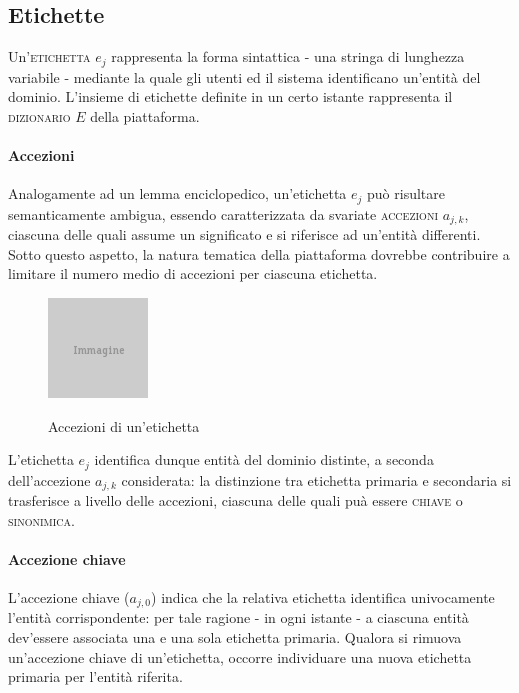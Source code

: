 \subsection{Etichette}
Un'\textsc{etichetta} $e_j$ rappresenta la forma sintattica - una stringa di lunghezza variabile - mediante la quale gli utenti ed il sistema identificano un'entità del dominio. L'insieme di etichette definite in un certo istante rappresenta il \textsc{dizionario} $E$ della piattaforma.

\paragraph{Accezioni}
Analogamente ad un lemma enciclopedico, un'etichetta $e_j$ può risultare semanticamente ambigua, essendo caratterizzata da svariate \textsc{accezioni} $a_{j,k}$, ciascuna delle quali assume un significato e si riferisce ad un'entità differenti. Sotto questo aspetto, la natura tematica della piattaforma dovrebbe contribuire a limitare il numero medio di accezioni per ciascuna etichetta.

\begin{figure}[ht]
\begin{center}
\includegraphics{placeholder.png}
\label{fig:tesi:stage:fase-uno:etichette-accezioni}
\caption{Accezioni di un'etichetta}
\end{center}
\end{figure}

L'etichetta $e_j$ identifica dunque entità del dominio distinte, a seconda dell'accezione $a_{j,k}$ considerata: la distinzione tra etichetta primaria e secondaria si trasferisce a livello delle accezioni, ciascuna delle quali puà essere \textsc{chiave} o \textsc{sinonimica}.

\paragraph{Accezione chiave}
L'accezione chiave ($a_{j,0}$) indica che la relativa etichetta identifica univocamente l'entità corrispondente: per tale ragione - in ogni istante - a ciascuna entità dev'essere associata una e una sola etichetta primaria. Qualora si rimuova un'accezione chiave di un'etichetta, occorre individuare una nuova etichetta primaria per l'entità riferita.

